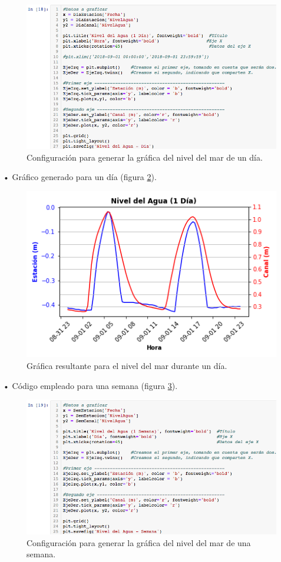 \documentclass[12pt]{article}
\begin{document}
\begin{figure}[h!]
	\raggedright
	\includegraphics[scale=.6]{./Images/nivel-dia}
	\caption{\label{fig:code-nivel-dia} Configuración para generar la gráfica del nivel del mar de un día.}		
\end{figure}

\noindent • Gráfico generado para un día (figura \ref{fig:graf-nivel-dia}).

\begin{figure}[h!]
	\center
	\includegraphics[scale=.6]{Nivel-del-Agua-Dia}
	\caption{\label{fig:graf-nivel-dia} Gráfica resultante para el nivel del mar durante un día.}
\end{figure}

\noindent • Código empleado para una semana (figura \ref{fig:code-nivel-sem}).

\begin{figure}[h!]
	\raggedright
	\includegraphics[scale=.6]{./Images/nivel-sem}
	\caption{\label{fig:code-nivel-sem} Configuración para generar la gráfica del nivel del mar de una semana.}		
\end{figure}
\end{document}
